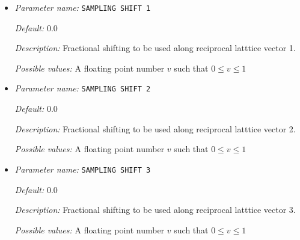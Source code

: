 \begin{itemize}
{\it Description:} Number of Monkhorts-Pack grid points to be used along reciprocal latttice vector 3.


{\it Possible values:} An integer $n$ such that $1\leq n \leq 100$
\item {\it Parameter name:} {\tt SAMPLING SHIFT 1}
\label{parameters:Brillouin zone k point sampling options/Monkhorst_2dPack _28MP_29 grid generation/SAMPLING SHIFT 1}
\label{parameters:Brillouin_20zone_20k_20point_20sampling_20options/Monkhorst_2dPack_20_28MP_29_20grid_20generation/SAMPLING_20SHIFT_201}


{\it Default:} 0.0


{\it Description:} Fractional shifting to be used along reciprocal latttice vector 1.


{\it Possible values:} A floating point number $v$ such that $0 \leq v \leq 1$
\item {\it Parameter name:} {\tt SAMPLING SHIFT 2}
\label{parameters:Brillouin zone k point sampling options/Monkhorst_2dPack _28MP_29 grid generation/SAMPLING SHIFT 2}
\label{parameters:Brillouin_20zone_20k_20point_20sampling_20options/Monkhorst_2dPack_20_28MP_29_20grid_20generation/SAMPLING_20SHIFT_202}


{\it Default:} 0.0


{\it Description:} Fractional shifting to be used along reciprocal latttice vector 2.


{\it Possible values:} A floating point number $v$ such that $0 \leq v \leq 1$
\item {\it Parameter name:} {\tt SAMPLING SHIFT 3}
\label{parameters:Brillouin zone k point sampling options/Monkhorst_2dPack _28MP_29 grid generation/SAMPLING SHIFT 3}
\label{parameters:Brillouin_20zone_20k_20point_20sampling_20options/Monkhorst_2dPack_20_28MP_29_20grid_20generation/SAMPLING_20SHIFT_203}


{\it Default:} 0.0


{\it Description:} Fractional shifting to be used along reciprocal latttice vector 3.


{\it Possible values:} A floating point number $v$ such that $0 \leq v \leq 1$
\end{itemize}

